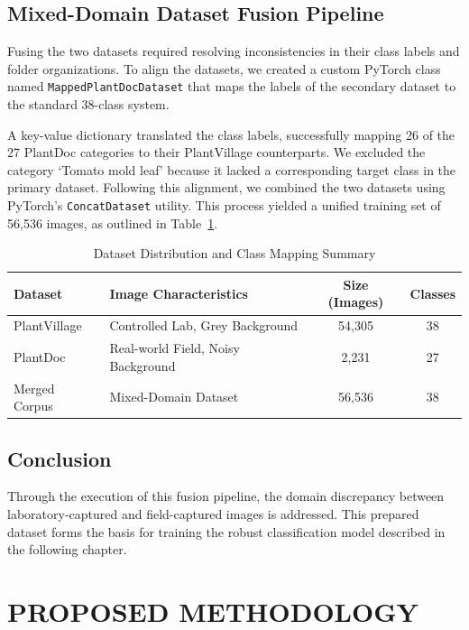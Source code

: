 \documentclass[12pt, a4paper]{report}
\begin{document}
\section{Mixed-Domain Dataset Fusion Pipeline}
Fusing the two datasets required resolving inconsistencies in their class labels and folder organizations. To align the datasets, we created a custom PyTorch class named \texttt{MappedPlantDocDataset} that maps the labels of the secondary dataset to the standard 38-class system.

A key-value dictionary translated the class labels, successfully mapping 26 of the 27 PlantDoc categories to their PlantVillage counterparts. We excluded the category `Tomato mold leaf' because it lacked a corresponding target class in the primary dataset. Following this alignment, we combined the two datasets using PyTorch's \texttt{ConcatDataset} utility. This process yielded a unified training set of 56,536 images, as outlined in Table~\ref{tab:dataset_distribution}.

\begin{table}[H]
\centering
\caption{Dataset Distribution and Class Mapping Summary}
\vspace{0.3cm}
\begin{tabular}{@{}llcc@{}}
\toprule
\textbf{Dataset} & \textbf{Image Characteristics} & \textbf{Size (Images)} & \textbf{Classes} \\
\midrule
PlantVillage & Controlled Lab, Grey Background & 54,305 & 38 \\
PlantDoc & Real-world Field, Noisy Background & 2,231 & 27 \\
Merged Corpus & Mixed-Domain Dataset & 56,536 & 38 \\
\bottomrule
\end{tabular}
\label{tab:dataset_distribution}
\end{table}

\section{Conclusion}
Through the execution of this fusion pipeline, the domain discrepancy between laboratory-captured and field-captured images is addressed. This prepared dataset forms the basis for training the robust classification model described in the following chapter.

\chapter{PROPOSED METHODOLOGY}
\end{document}
